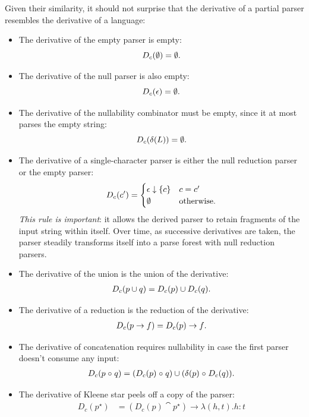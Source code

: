 Given their similarity, it should not surprise that the derivative of a partial
parser resembles the derivative of a language:
\begin{itemize}

\item 
The derivative of the empty parser is empty:
\begin{equation*}
 D_c(\emptyset) = \emptyset
 \text.
\end{equation*}

\item
The derivative of the null parser is also empty:
\begin{equation*}
 D_c(\epsilon) = \emptyset
 \text.
\end{equation*}

\item
The derivative of the nullability combinator must be empty, since it at most
parses the empty string:
\begin{equation*}
 D_c(\delta(L)) = \emptyset
 \text.
\end{equation*}


\item
The derivative of a single-character parser is either the null reduction parser
or the empty parser:
\begin{equation*}
D_c(c') =
\begin{cases}
 \epsilon \downarrow \left\{ c \right\} & c = c'
 \\
 \emptyset & \text{otherwise.}
\end{cases}
\end{equation*}
\emph{This rule is important}:
it allows the derived parser to retain fragments
of the input string within itself.
%
Over time, as successive derivatives are taken, the parser steadily transforms
itself into a parse forest with null reduction parsers.



\item
The derivative of the union is the union of the derivative:
\begin{align*}
 D_c(p \cup q) = D_c(p) \cup D_c(q)
 \text.
\end{align*}


\item
The derivative of a reduction is the reduction of the derivative:
\begin{align*}
 D_c(p \to f) = D_c(p) \to f
 \text.
\end{align*}

\item
The derivative of concatenation requires nullability in case the first parser
doesn't consume any input:
\begin{align*}
 D_c(p \mathrel{\circ} q) = 
 (D_c(p) \mathrel{\circ} q)
 \cup
 (\delta(p) \mathrel{\circ} D_c(q))
 \text.
\end{align*}

\item
The derivative of Kleene star peels off a copy of the parser:
\begin{align*}
 D_c(p^\star) &= (D_c(p) \cat p^\star) \to \lambda (h,t) . h : t
\end{align*}


\end{itemize}

